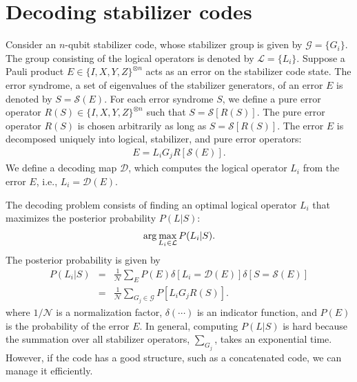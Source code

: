 \chapter{Decoding stabilizer codes}
\label{Ap:Decode}
Consider an $n$-qubit stabilizer code, whose stabilizer group is given by $\mathcal{G}=\{ G_i \} $.
The group consisting of the logical operators is denoted by $\mathcal{L}=\{ L_i \}$.
Suppose a Pauli product $E \in \{ I,X,Y,Z\}^{\otimes n}$ acts as an error on the stabilizer code state.
The error syndrome, a set of eigenvalues of the stabilizer generators, of an error $E$ is denoted by $S=\mathcal{S}(E)$. 	
For each error syndrome $S$, we define a pure error operator $R(S) \in \{ I,X,Y,Z\}^{\otimes n}$ such that $S= \mathcal{S}[R(S)]$.
The pure error operator $R(S)$ is chosen arbitrarily as long as $S= \mathcal{S}[R(S)]$.
The error $E$ is decomposed uniquely into logical, stabilizer, and pure error operators:
\begin{eqnarray}
E=L_i G_j R[\mathcal{S}(E)].
\end{eqnarray}
We define a decoding map $\mathcal{D}$, which computes the logical operator $L_i$ from the error $E$, i.e., $L_i=\mathcal{D}(E)$.

The decoding problem consists of finding an optimal logical operator $L_i$ that maximizes the posterior probability $P(L|S)$:
\begin{eqnarray}
{\rm arg} \max _{L_i \in \mathcal{L}} P(L_i|S).
\end{eqnarray}
The posterior probability is given by
\begin{eqnarray}
P(L_i| S) &=& \frac{1}{\mathcal{N}}\sum _{E} P(E) \delta [L_i=\mathcal{D}(E)] \delta [S=\mathcal{S}(E)]
\\
&=&  \frac{1}{\mathcal{N}} \sum _{G_j \in \mathcal{G}} P[L_i G_j R(S)].
\end{eqnarray}
where $1/\mathcal{N}$ is a normalization factor, $\delta (\cdots)$ is an indicator function, and $P(E)$ is the probability of the error $E$.
In general, computing $P(L|S)$ is hard because the summation over all stabilizer operators, $\sum _{G_j}$, takes an exponential time.
However, if the code has a good structure, such as a concatenated code, we can manage it efficiently.

